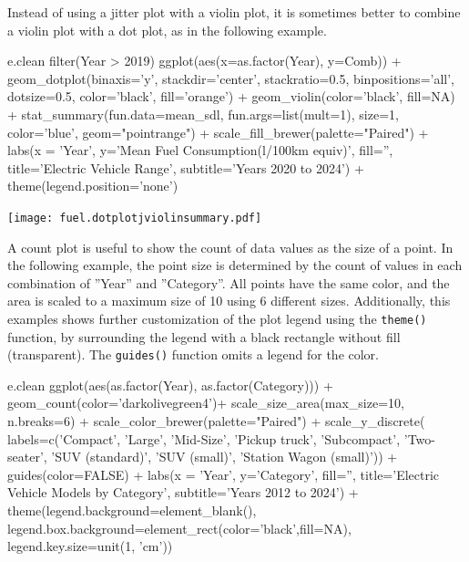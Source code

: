 Instead of using a jitter plot with a violin plot, it is sometimes better to combine a violin plot with a dot plot, as in the following example.

\begin{samepage}
\begin{Rcode}
e.clean %
  filter(Year > 2019) %
  ggplot(aes(x=as.factor(Year), y=Comb)) +
    geom_dotplot(binaxis='y', 
                 stackdir='center', stackratio=0.5,
                 binpositions='all', dotsize=0.5, 
                 color='black', fill='orange') +
    geom_violin(color='black', fill=NA) + 
    stat_summary(fun.data=mean_sdl, 
                 fun.args=list(mult=1), 
                 size=1, color='blue', 
                 geom="pointrange") +
    scale_fill_brewer(palette="Paired") +
    labs(x = 'Year', 
         y='Mean Fuel Consumption\n(l/100km equiv)', 
         fill='', 
         title='Electric Vehicle Range', 
         subtitle='Years 2020 to 2024') +
     theme(legend.position='none')
\end{Rcode}
\end{samepage}

\begin{center}
  \texttt{[image: fuel.dotplotjviolinsummary.pdf]}
\end{center}

A count plot is useful to show the count of data values as the size of a point. In the following example, the point size is determined by the count of values in each combination of ''Year'' and ''Category''. All points have the same color, and the area is scaled to a maximum size of 10 using 6 different sizes. Additionally, this examples shows further customization of the plot legend using the \texttt{theme()} function, by surrounding the legend with a black rectangle without fill (transparent). The \texttt{guides()} function omits a legend for the color. 

\begin{samepage}
\begin{Rcode}
e.clean %
  ggplot(aes(as.factor(Year), as.factor(Category))) +
    geom_count(color='darkolivegreen4')+
    scale_size_area(max_size=10, n.breaks=6) + 
    scale_color_brewer(palette="Paired") +
    scale_y_discrete(
      labels=c('Compact', 'Large', 'Mid-Size', 'Pickup truck', 
               'Subcompact', 'Two-seater', 'SUV (standard)', 
               'SUV (small)', 'Station Wagon (small)')) + 
    guides(color=FALSE) +
    labs(x = 'Year',
         y='Category', 
         fill='', 
         title='Electric Vehicle Models by Category', 
         subtitle='Years 2012 to 2024') +
    theme(legend.background=element_blank(), 
          legend.box.background=element_rect(color='black',fill=NA),
          legend.key.size=unit(1, 'cm'))
\end{Rcode}
\end{samepage}

